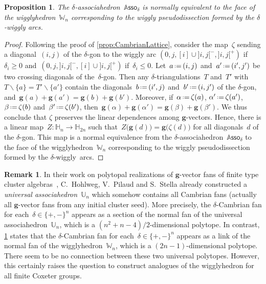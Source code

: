 \documentclass{amsart}
\newtheorem{proposition}[theorem]{Proposition}
\theoremstyle{definition}
\newtheorem{remark}[theorem]{Remark}
\newcommand{\HH}{\mathbb{H}} %
\renewcommand{\b}[1]{{\boldsymbol{#1}}} %
\newcommand{\ssm}{\smallsetminus} %
\newcommand{\eqdef}{\mbox{\,\raisebox{0.2ex}{\scriptsize\ensuremath{\mathrm:}}\ensuremath{=}\,}} %
\newcommand{\darkblue}{\color{darkblue}} %
\newcommand{\defn}[1]{\textsl{\darkblue #1}} %
\newcommand{\vincent}[1]{\todo[color=blue!30]{\rm #1 \\ \hfill --- V.}}
\newcommand{\polytope}[1]{\mathds{#1}} %
\newcommand{\wigglyhedron}{\polytope{W}} %
\newcommand{\Asso}{\polytope{A}\mathsf{sso}} %
\begin{document}
\begin{proposition}
\label{prop:CambrianFan}
The $\delta$-associahedron~$\Asso_\delta$ is normally equivalent to the face of the wigglyhedron~$\wigglyhedron_n$ corresponding to the wiggly pseudodissection formed by the $\delta$-wiggly arcs.
\end{proposition}

\begin{proof}
Following the proof of \cref{prop:CambrianLattice}, consider the map~$\zeta$ sending a diagonal~$(i,j)$ of the $\delta$-gon to the wiggly arc $(0, j, [i] \cup {]i,j[}^-, {]i,j[}^+)$ if~$\delta_i \ge 0$ and~$(0, j, {]i,j[}^-, [i] \cup {]i,j[}^+)$ if~$\delta_i \le 0$.
Let~$a \eqdef (i,j)$ and~$a' \eqdef (i',j')$ be two crossing diagonals of the~$\delta$-gon.
Then any $\delta$-triangulations~$T$ and~$T'$ with~$T \ssm \{a\} = T' \ssm \{a'\}$ contain the diagonals~$b \eqdef (i',j)$ and~$b' \eqdef (i,j')$ of the $\delta$-gon, and~$\b{g}(a) + \b{g}(a') = \b{g}(b) + \b{g}(b')$.
Moreover, if~$\alpha \eqdef \zeta(a)$, $\alpha' \eqdef \zeta(a')$, $\beta \eqdef \zeta(b)$ and~$\beta' \eqdef \zeta(b')$, then~$\b{g}(\alpha) + \b{g}(\alpha') = \b{g}(\beta) + \b{g}(\beta')$.
We thus conclude that $\zeta$ preserves the linear dependences among $\b{g}$-vectors.
Hence, there is a linear map~$Z : \HH_n \to \HH_{2n}$ such that~$Z \big( \b{g}(d) \big) = \b{g} \big( \zeta(d) \big)$ for all diagonals~$d$ of the $\delta$-gon.
This map is a normal equivalence from the $\delta$-associahedron~$\Asso_\delta$ to the face of the wigglyhedron~$\wigglyhedron_n$ corresponding to the wiggly pseudodissection formed by the $\delta$-wiggly~arcs.
\end{proof}


\begin{remark}
In their work on polytopal realizations of $\b{g}$-vector fans of finite type cluster algebras~\cite{HohlwegPilaudStella}, C.~Hohlweg, V.~Pilaud and S.~Stella already constructed a \defn{universal associahedron}~$\polytope{U}_n$ which somehow contains all Cambrian fans (actually all $\b{g}$-vector fans from any initial cluster seed).
More precisely, the $\delta$-Cambrian fan for each~$\delta \in \{+,-\}^n$  appears as a section of the normal fan of the universal associahedron~$\polytope{U}_n$, which is a $(n^2+n-4)/2$-dimensional polytope.
In contrast, \cref{prop:CambrianFan} states that the $\delta$-Cambrian fan for each~$\delta \in \{+,-\}^n$ appears as a link of the normal fan of the wigglyhedron~$\wigglyhedron_n$, which is a $(2n-1)$-dimensional polytope.
There seem to be no connection between these two universal polytopes.
However, this certainly raises the question to construct analogues of the wigglyhedron for all finite Coxeter groups.
\end{remark}
\end{document}
